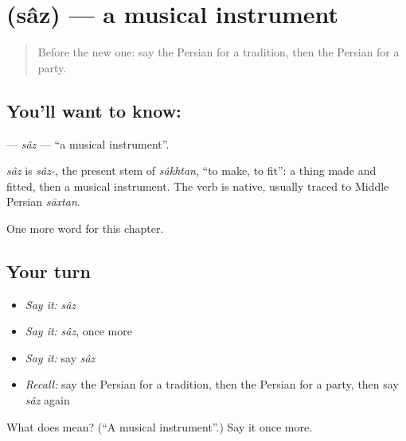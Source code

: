 \section[\texorpdfstring{\fa{ساز} (sâz)}{ساز (sâz)}]{ (sâz) — a musical instrument}

\label{lesson:FA-C207-saz}



\begin{quote}
Before the new one: say the Persian for a tradition, then the Persian for a party.
\end{quote}

\subsection*{You'll want to know: }
\textbf{} — \emph{sâz} — \textquotedblleft{}a musical instrument\textquotedblright{}.

\begin{cousinweb}
\emph{sâz} is \emph{sâz-}, the present stem of \emph{sâkhtan}, \textquotedblleft{}to make, to fit\textquotedblright{}: a thing made and fitted, then a musical instrument. The verb is native, usually traced to Middle Persian \emph{sāxtan}.
\end{cousinweb}

\begin{grammarlens}[title={What you've built}]
One more word for this chapter.
\end{grammarlens}

\subsection*{Your turn}
\begin{itemize}
\raggedright
  \item \emph{Say it:} \emph{sâz}
  \item \emph{Say it:} \emph{sâz}, once more
  \item \emph{Say it:} say \emph{sâz}
  \item \emph{Recall:} say the Persian for a tradition, then the Persian for a party, then say \emph{sâz} again
\end{itemize}

\begin{tcolorbox}[breakable,colback=teal!4,colframe=teal!35!black,title={Before you move on}]
What does  mean? (\textquotedblleft{}A musical instrument\textquotedblright{}.) Say it once more.
\end{tcolorbox}

